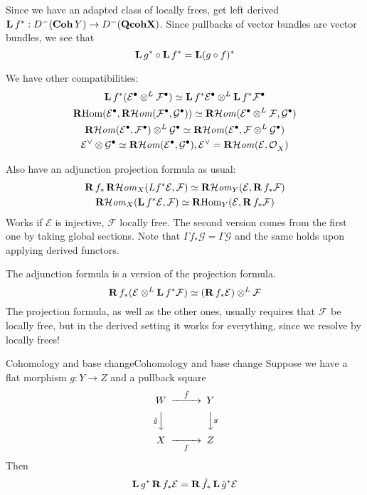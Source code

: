 Since we have an adapted class of locally frees, get left derived $\operatorname{\mathbf{L}} f^*:D^-(\mathbf{Coh}\,Y)\rightarrow D^-(\mathbf{Qcoh X})$. Since pullbacks of vector bundles are vector bundles, we see that $$\operatorname{\mathbf{L}} g^*\circ \operatorname{\mathbf{L}} f^*=\operatorname{\mathbf{L}} (g\circ f)^*$$


We have other compatibilities: 
$$\begin{gathered} \operatorname{\mathbf{L}} f^*(\mathcal{E}^\bullet \otimes^L \mathcal{F}^\bullet)\simeq \operatorname{\mathbf{L}} f^*\mathcal{E}^\bullet \otimes^L \operatorname{\mathbf{L}} f^* \mathcal{F}^\bullet \\ 
\operatorname{\mathbf{R}Hom}(\mathcal{E}^\bullet, \operatorname{\mathbf{R}\mathcal{H}\mathit{om}}(\mathcal{F}^\bullet,\mathcal{G}^\bullet))\simeq \operatorname{\mathbf{R}\mathcal{H}\mathit{om}}(\mathcal{E}^\bullet\otimes^L \mathcal{ F}, \mathcal{G}^\bullet)\\
\operatorname{\mathbf{R}\mathcal{H}\mathit{om}}(\mathcal{E}^\bullet, \mathcal{F}^\bullet)\otimes^L \mathcal{G}^\bullet
\simeq \operatorname{\mathbf{R}\mathcal{H}\mathit{om}}(\mathcal{E}^\bullet, \mathcal{F}\otimes^L \mathcal{G}^\bullet)\\
\mathcal{E}^\lor\otimes \mathcal{G}^\bullet \simeq \operatorname{\mathbf{R}\mathcal{H}\mathit{om}}(\mathcal{E}^\bullet, \mathcal{G}^\bullet), \mathcal{E^\lor = \operatorname{\mathbf{R}\mathcal{H}\mathit{om}}(\mathcal{E}, \mathcal{O}}_{X})\end{gathered} $$

Also have an adjunction projection formula as usual: 
$$\begin{gathered}
    \operatorname{\mathbf{R}} f_{*}\operatorname{\mathbf{R}\mathcal{H}\mathit{om}}_{X}(Lf^*\mathcal{E},\mathcal{F})\simeq \operatorname{\mathbf{R}\mathcal{H}\mathit{om}}_{Y}(\mathcal{E}, \operatorname{\mathbf{R}} f_{*}\mathcal{F}) \\
\operatorname{\mathbf{R}\mathcal{H}\mathit{om}}_{X}(\operatorname{\mathbf{L}} f^*\mathcal{E}, \mathcal{F})\simeq \operatorname{\mathbf{R}Hom}_{Y}(\mathcal{E}, \operatorname{\mathbf{R}} f_{*}\mathcal{F})
\end{gathered}$$
Works if $\mathcal{E}$ is injective, $\mathcal{F}$ locally free. The second version comes from the first one by taking global sections. Note that $\Gamma f_{*} \mathcal{G}=\Gamma \mathcal{G}$ and the same holds upon applying derived functors.

The adjunction formula is a version of the projection formula.
$$\operatorname{\mathbf{R}} f_{*} (\mathcal{E}\otimes^L \operatorname{\mathbf{L}} f^*\mathcal{F})\simeq (\operatorname{\mathbf{R}} f_{* }\mathcal{E})\otimes^L \mathcal{F}$$
The projection formula, as well as the other ones, usually requires that $\mathcal{F}$ be locally free, but in the derived setting it works for everything, since we resolve by locally frees! 

\begin{theorem}{Cohomology and base change}{Cohomology and base change}
    Suppose we have a flat morphism $g:Y\xrightarrow{}Z$ and a pullback square $$\begin{CD}W @> \tilde{f}> > Y \\ @V\tilde{g}VV @VVgV \\ X @> >f > Z
    \end{CD}$$
    Then $$\operatorname{\mathbf{L}} g^* \operatorname{\mathbf{R}} f_{*}\mathcal{E}=\operatorname{\mathbf{R}} \tilde{f}_{*}\operatorname{\mathbf{L}} \tilde{g}^*\mathcal{E}$$
\end{theorem}


